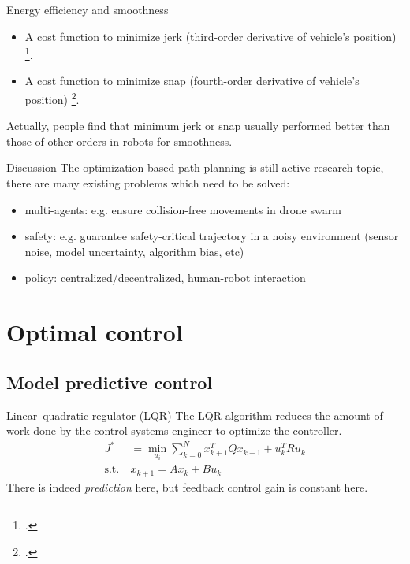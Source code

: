 \documentclass{beamer}
\begin{document}
\begin{frame}{Energy efficiency and smoothness}
	\begin{itemize}
		\item A cost function to minimize jerk (third-order derivative of vehicle's position) \footcite{pattacini2010experimental}.
		\item A cost function to minimize snap (fourth-order derivative of vehicle's position) \footcite{mellinger2011minimum}.
	\end{itemize}

	Actually, people find that minimum jerk or snap usually performed better than those of other orders in robots for smoothness. 
\end{frame}

\begin{frame}{Discussion}
	The optimization-based path planning is still active research topic, there are many existing problems which need to be solved:
	\begin{itemize}
		\item multi-agents: e.g. ensure collision-free movements in drone swarm
		\item safety: e.g. guarantee safety-critical trajectory in a noisy environment (sensor noise, model uncertainty, algorithm bias, etc)
		\item policy: centralized/decentralized, human-robot interaction
	\end{itemize}
	
\end{frame}

\section{Optimal control}
\subsection{Model predictive control}
\begin{frame}{Linear–quadratic regulator (LQR)}
	The LQR algorithm reduces the amount of work done by the control systems engineer to optimize the controller.
	\begin{align*}
		J^* &= \min_{u_i} \sum_{k = 0}^{N} x_{k+1}^T Q x_{k+1} + u_k^T R u_k \\
		\text{s.t.} \ & x_{k+1} = A x_{k} + B u_{k}
	\end{align*}
	There is indeed \emph{prediction} here, but feedback control gain is constant here.
\end{frame}
\end{document}
